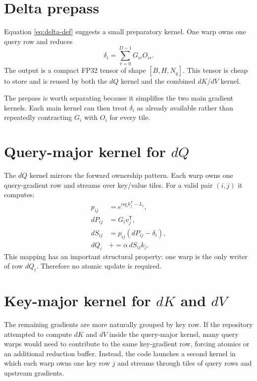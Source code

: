 \section{Delta prepass}

Equation \eqref{eq:delta-def} suggests a small preparatory kernel. One warp owns one query row and reduces
\begin{equation}
  \delta_i = \sum_{r=0}^{D-1} G_{ir} O_{ir}.
\end{equation}
The output is a compact FP32 tensor of shape $[B,H,N_q]$. This tensor is cheap to store and is reused by both the $dQ$ kernel and the combined $dK$/$dV$ kernel.

The prepass is worth separating because it simplifies the two main gradient kernels. Each main kernel can then treat $\delta_i$ as already available rather than repeatedly contracting $G_i$ with $O_i$ for every tile.

\section{Query-major kernel for \texorpdfstring{$dQ$}{dQ}}

The $dQ$ kernel mirrors the forward ownership pattern. Each warp owns one query-gradient row and streams over key/value tiles. For a valid pair $(i,j)$ it computes:
\begin{align}
  p_{ij} &= e^{\alpha q_i k_j^{\mathsf T} - L_i}, \\
  dP_{ij} &= G_i v_j^{\mathsf T}, \\
  dS_{ij} &= p_{ij}(dP_{ij} - \delta_i), \\
  dQ_i &\mathrel{+}= \alpha\, dS_{ij} k_j.
\end{align}
This mapping has an important structural property: one warp is the only writer of row $dQ_i$. Therefore no atomic update is required.

\section{Key-major kernel for \texorpdfstring{$dK$}{dK} and \texorpdfstring{$dV$}{dV}}

The remaining gradients are more naturally grouped by key row. If the repository attempted to compute $dK$ and $dV$ inside the query-major kernel, many query warps would need to contribute to the same key-gradient row, forcing atomics or an additional reduction buffer. Instead, the code launches a second kernel in which each warp owns one key row $j$ and streams through tiles of query rows and upstream gradients.

